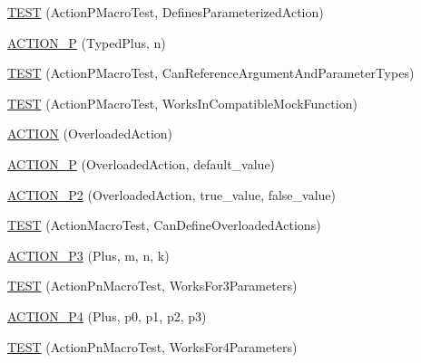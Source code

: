 \begin{DoxyCompactItemize}
\item 
\mbox{\hyperlink{namespacetesting_1_1gmock__generated__actions__test_a42a5fe606ca18b2eb1e5d7884045118f}{T\+E\+ST}} (Action\+P\+Macro\+Test, Defines\+Parameterized\+Action)
\item 
\mbox{\hyperlink{namespacetesting_1_1gmock__generated__actions__test_a3bcd440e11ab64ad5eb007efce33cf7d}{A\+C\+T\+I\+O\+N\+\_\+P}} (Typed\+Plus, n)
\item 
\mbox{\hyperlink{namespacetesting_1_1gmock__generated__actions__test_a4262c10efb367abf9771b3060c57d190}{T\+E\+ST}} (Action\+P\+Macro\+Test, Can\+Reference\+Argument\+And\+Parameter\+Types)
\item 
\mbox{\hyperlink{namespacetesting_1_1gmock__generated__actions__test_ab545244777c7559d1b0c2c63ee2be134}{T\+E\+ST}} (Action\+P\+Macro\+Test, Works\+In\+Compatible\+Mock\+Function)
\item 
\mbox{\hyperlink{namespacetesting_1_1gmock__generated__actions__test_a24927d97882dc1d52e203720df804188}{A\+C\+T\+I\+ON}} (Overloaded\+Action)
\item 
\mbox{\hyperlink{namespacetesting_1_1gmock__generated__actions__test_a1ee92e8b8bd6a5a54f5d2fcdb9f122b8}{A\+C\+T\+I\+O\+N\+\_\+P}} (Overloaded\+Action, default\+\_\+value)
\item 
\mbox{\hyperlink{namespacetesting_1_1gmock__generated__actions__test_a233ee874462c7956e154945975da1127}{A\+C\+T\+I\+O\+N\+\_\+\+P2}} (Overloaded\+Action, true\+\_\+value, false\+\_\+value)
\item 
\mbox{\hyperlink{namespacetesting_1_1gmock__generated__actions__test_a8a3d26365bdae172067fe3a63bd88e85}{T\+E\+ST}} (Action\+Macro\+Test, Can\+Define\+Overloaded\+Actions)
\item 
\mbox{\hyperlink{namespacetesting_1_1gmock__generated__actions__test_a35c62beac532eaff7e54b8ad4a7fe1cf}{A\+C\+T\+I\+O\+N\+\_\+\+P3}} (Plus, m, n, k)
\item 
\mbox{\hyperlink{namespacetesting_1_1gmock__generated__actions__test_a3579cf2428f584d2a837c2c219ec1d5a}{T\+E\+ST}} (Action\+Pn\+Macro\+Test, Works\+For3\+Parameters)
\item 
\mbox{\hyperlink{namespacetesting_1_1gmock__generated__actions__test_ac86e9e1fa5be82823e80247ba093301c}{A\+C\+T\+I\+O\+N\+\_\+\+P4}} (Plus, p0, p1, p2, p3)
\item 
\mbox{\hyperlink{namespacetesting_1_1gmock__generated__actions__test_a6c13e382007960236763d638542bc5fe}{T\+E\+ST}} (Action\+Pn\+Macro\+Test, Works\+For4\+Parameters)
\item 

\end{DoxyCompactItemize}
